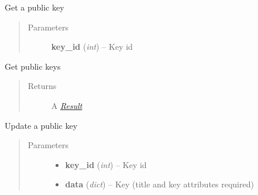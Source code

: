\documentclass[letterpaper,10pt,english]{sphinxmanual}
\begin{document}
\begin{fulllineitems}

\begin{fulllineitems}
\label{users:pygithub3.services.users.Keys.get}
Get a public key
\begin{quote}\begin{description}
\item[{Parameters}] \leavevmode
\textbf{key\_id} (\emph{int}) -- Key id

\end{description}\end{quote}

\end{fulllineitems}


\begin{fulllineitems}
\label{users:pygithub3.services.users.Keys.list}
Get public keys
\begin{quote}\begin{description}
\item[{Returns}] \leavevmode
A {\hyperref[result::doc]{\emph{Result}}}

\end{description}\end{quote}

\end{fulllineitems}


\begin{fulllineitems}
\label{users:pygithub3.services.users.Keys.update}
Update a public key
\begin{quote}\begin{description}
\item[{Parameters}] \leavevmode\begin{itemize}
\item {} 
\textbf{key\_id} (\emph{int}) -- Key id

\item {} 
\textbf{data} (\emph{dict}) -- Key (title and key attributes required)

\end{itemize}

\end{description}\end{quote}


\end{fulllineitems}
\end{fulllineitems}
\end{document}

